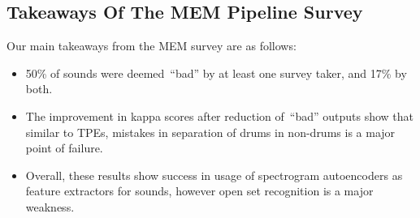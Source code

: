 \documentclass[\main/thesis.tex]{subfiles}
\begin{document}

\subsection{Takeaways Of The MEM Pipeline Survey}
\label{survey2_takeaway}
Our main takeaways from the MEM survey are as follows:
\begin{itemize}
\item 50\% of sounds were deemed~\enquote{bad} by at least one survey taker, and 17\% by both.
\item The improvement in kappa scores after reduction of~\enquote{bad} outputs show that similar to TPEs, mistakes in separation of drums in non-drums is a major point of failure. 
\item Overall, these results show success in usage of spectrogram autoencoders as feature extractors for sounds, however open set recognition is a major weakness. 
\end{itemize}
\end{document}
